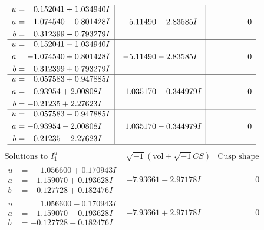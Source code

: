 \documentclass[1p]{elsarticle_modified}
\theoremstyle{definition}
\newcommand{\I}{\sqrt{-1}}
\begin{document}
$$\begin{array}{c|c|c}
\begin{aligned}
u &= \phantom{-}0.152041 + 1.034940 I \\
a &= -1.074540 - 0.801428 I \\
b &= \phantom{-}0.312399 - 0.793279 I\end{aligned}
 & -5.11490 + 2.83585 I & \phantom{-0.000000 } 0 \\ \hline\begin{aligned}
u &= \phantom{-}0.152041 - 1.034940 I \\
a &= -1.074540 + 0.801428 I \\
b &= \phantom{-}0.312399 + 0.793279 I\end{aligned}
 & -5.11490 - 2.83585 I & \phantom{-0.000000 } 0 \\ \hline\begin{aligned}
u &= \phantom{-}0.057583 + 0.947885 I \\
a &= -0.93954 + 2.00808 I \\
b &= -0.21235 + 2.27623 I\end{aligned}
 & \phantom{-}1.035170 + 0.344979 I & \phantom{-0.000000 } 0 \\ \hline\begin{aligned}
u &= \phantom{-}0.057583 - 0.947885 I \\
a &= -0.93954 - 2.00808 I \\
b &= -0.21235 - 2.27623 I\end{aligned}
 & \phantom{-}1.035170 - 0.344979 I & \phantom{-0.000000 } 0\\
 \hline 
 \end{array}$$\newpage$$\begin{array}{c|c|c}  
\text{Solutions to }I^u_{1}& \I (\text{vol} + \sqrt{-1}CS) & \text{Cusp shape}\\
 \hline 
\begin{aligned}
u &= \phantom{-}1.056600 + 0.170943 I \\
a &= -1.159070 + 0.193628 I \\
b &= -0.127728 + 0.182476 I\end{aligned}
 & -7.93661 - 2.97178 I & \phantom{-0.000000 } 0 \\ \hline\begin{aligned}
u &= \phantom{-}1.056600 - 0.170943 I \\
a &= -1.159070 - 0.193628 I \\
b &= -0.127728 - 0.182476 I\end{aligned}
 & -7.93661 + 2.97178 I & \phantom{-0.000000 } 0 \\ \hline\begin{aligned}

\end{aligned}
\end{array}$$
\end{document}
